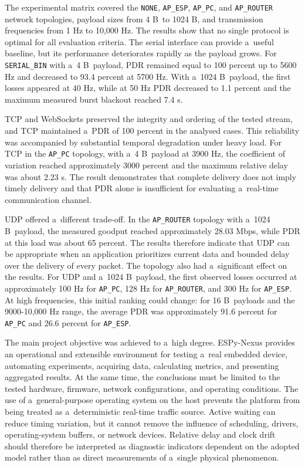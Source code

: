 The experimental matrix covered the \texttt{NONE}, \texttt{AP\_ESP}, \texttt{AP\_PC}, and \texttt{AP\_ROUTER} network topologies, payload sizes from 4 B~to 1024 B, and transmission frequencies from 1 Hz to 10,000 Hz.
The results show that no single protocol is optimal for all evaluation criteria.
The serial interface can provide a~useful baseline, but its performance deteriorates rapidly as the payload grows.
For \texttt{SERIAL\_BIN} with a~4 B~payload, PDR remained equal to 100 percent up to 5600 Hz and decreased to 93.4 percent at 5700 Hz.
With a~1024 B~payload, the first losses appeared at 40 Hz, while at 50 Hz PDR decreased to 1.1 percent and the maximum measured burst blackout reached 7.4 s.

TCP and WebSockets preserved the integrity and ordering of the tested stream, and TCP maintained a~PDR of 100 percent in the analysed cases.
This reliability was accompanied by substantial temporal degradation under heavy load.
For TCP in the \texttt{AP\_PC} topology, with a~4 B~payload at 3900 Hz, the coefficient of variation reached approximately 3000 percent and the maximum relative delay was about 2.23 s.
The result demonstrates that complete delivery does not imply timely delivery and that PDR alone is insufficient for evaluating a~real-time communication channel.

UDP offered a~different trade-off.
In the \texttt{AP\_ROUTER} topology with a~1024 B~payload, the measured goodput reached approximately 28.03 Mbps, while PDR at this load was about 65 percent.
The results therefore indicate that UDP can be appropriate when an application prioritizes current data and bounded delay over the delivery of every packet.
The topology also had a~significant effect on the results.
For UDP and a~1024 B~payload, the first observed losses occurred at approximately 100 Hz for \texttt{AP\_PC}, 128 Hz for \texttt{AP\_ROUTER}, and 300 Hz for \texttt{AP\_ESP}.
At high frequencies, this initial ranking could change: for 16 B~payloads and the 9000-10,000 Hz range, the average PDR was approximately 91.6 percent for \texttt{AP\_PC} and 26.6 percent for \texttt{AP\_ESP}.

The main project objective was achieved to a~high degree.
ESPy-Nexus provides an operational and extensible environment for testing a~real embedded device, automating experiments, acquiring data, calculating metrics, and presenting aggregated results.
At the same time, the conclusions must be limited to the tested hardware, firmware, network configurations, and operating conditions.
The use of a~general-purpose operating system on the host prevents the platform from being treated as a~deterministic real-time traffic source.
Active waiting can reduce timing variation, but it cannot remove the influence of scheduling, drivers, operating-system buffers, or network devices.
Relative delay and clock drift should therefore be interpreted as diagnostic indicators dependent on the adopted model rather than as direct measurements of a~single physical phenomenon.

